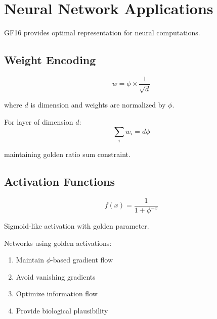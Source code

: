 \section{Neural Network Applications}

GF16 provides optimal representation for neural computations.

\subsection{Weight Encoding}

\begin{definition}[GF16 Weight]
\label{def:gf16-weight}
\begin{equation}
w = \phi \times \frac{1}{\sqrt{d}}
\end{equation}

where $d$ is dimension and weights are normalized by $\phi$.
\end{definition}

\begin{proposition}
\label{prop:golden-weights}
For layer of dimension $d$:
\begin{equation}
\sum_i w_i = d \phi
\end{equation}

maintaining golden ratio sum constraint.
\end{proposition}

\subsection{Activation Functions}

\begin{definition}
\label{def:golden-activation}
\begin{equation}
f(x) = \frac{1}{1 + \phi^{-x}}
\end{equation}

Sigmoid-like activation with golden parameter.
\end{definition}

\begin{theorem}
\label{thm:golden-opt}
Networks using golden activations:
\begin{enumerate}
\item Maintain $\phi$-based gradient flow
\item Avoid vanishing gradients
\item Optimize information flow
\item Provide biological plausibility
\end{enumerate}
\end{theorem}

